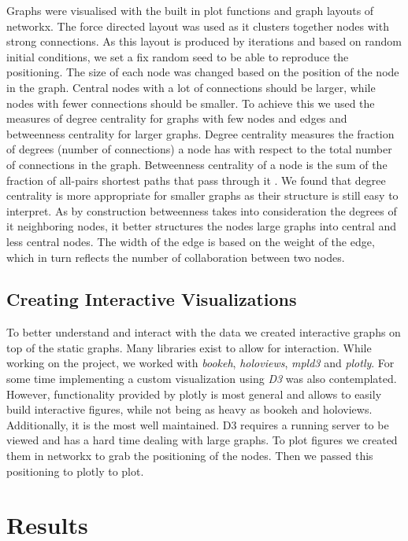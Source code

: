 \documentclass[article,twocolumn]{IEEEtran}
\begin{document}
Graphs were visualised with the built in plot functions and graph
layouts of networkx. The force directed layout was used as it clusters
together nodes with strong connections. As this layout is produced by
iterations and based on random initial conditions, we set a fix random
seed to be able to reproduce the positioning. The size of each node was
changed based on the position of the node in the graph. Central nodes
with a lot of connections should be larger, while nodes with fewer
connections should be smaller. To achieve this we used the measures of
degree centrality for graphs with few nodes and edges and betweenness
centrality for larger graphs. Degree centrality measures the fraction of
degrees (number of connections) a node has with respect to the total
number of connections in the graph. Betweenness centrality of a node is
the sum of the fraction of all-pairs shortest paths that pass through it
\cite{borgatti2014social}. We found that degree centrality is more
appropriate for smaller graphs as their structure is still easy to
interpret. As by construction betweenness takes into consideration the
degrees of it neighboring nodes, it better structures the nodes large
graphs into central and less central nodes. The width of the edge is
based on the weight of the edge, which in turn reflects the number of
collaboration between two nodes.

    \hypertarget{creating-interactive-visualizations}{%
\subsection{Creating Interactive
Visualizations}\label{creating-interactive-visualizations}}

To better understand and interact with the data we created interactive
graphs on top of the static graphs. Many libraries exist to allow for
interaction. While working on the project, we worked with \emph{bookeh},
\emph{holoviews}, \emph{mpld3} and \emph{plotly}. For some time
implementing a custom visualization using \emph{D3} was also
contemplated. However, functionality provided by plotly is most general
and allows to easily build interactive figures, while not being as heavy
as bookeh and holoviews. Additionally, it is the most well maintained.
D3 requires a running server to be viewed and has a hard time dealing
with large graphs. To plot figures we created them in networkx to grab
the positioning of the nodes. Then we passed this positioning to plotly
to plot.

    \hypertarget{results}{%
\section{Results}\label{results}}
\end{document}
